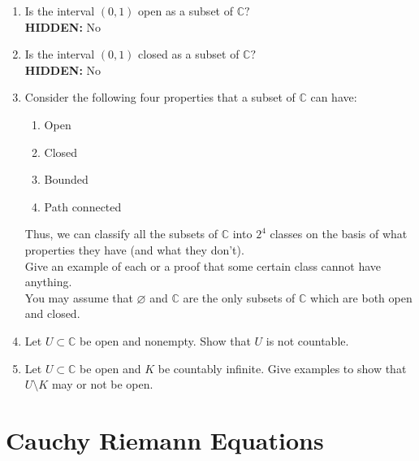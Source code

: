 \documentclass[12pt]{article}
\theoremstyle{definition}
\numberwithin{thm}{section}
\let\emptyset\varnothing
\newcommand{\hint}[1]{\textbf{HIDDEN:} {\color[rgb]{0.95, 0.95, 0.95}#1}}
\begin{document}
\begin{enumerate}
	\item Is the interval $(0, 1)$ open as a subset of $\mathbb{C}?$\\
	\hint{No}
	\item Is the interval $(0, 1)$ closed as a subset of $\mathbb{C}?$\\
	\hint{No}
	\item Consider the following four properties that a subset of $\mathbb{C}$ can have:
	\begin{enumerate}
		\item Open
		\item Closed
		\item Bounded
		\item Path connected
	\end{enumerate}
	Thus, we can classify all the subsets of $\mathbb{C}$ into $2^4$ classes on the basis of what properties they have (and what they don't).\\
	Give an example of each or a proof that some certain class cannot have anything.\\
	You may assume that $\emptyset$ and $\mathbb{C}$ are the only subsets of $\mathbb{C}$ which are both open and closed.
	\item Let $U \subset \mathbb{C}$ be open and nonempty. Show that $U$ is not countable.
	\item Let $U \subset \mathbb{C}$ be open and $K$ be countably infinite. Give examples to show that $U\setminus K$ may or not be open.
\end{enumerate}
\newpage\section{Cauchy Riemann Equations}
\end{document}
